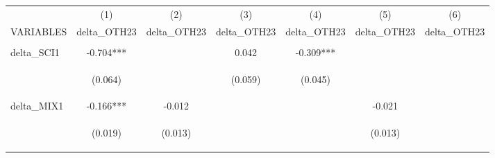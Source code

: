 \begin{center}
\begin{tabular}{lcccccc} \hline
 & (1) & (2) & (3) & (4) & (5) & (6) \\
VARIABLES & delta\_OTH23 & delta\_OTH23 & delta\_OTH23 & delta\_OTH23 & delta\_OTH23 & delta\_OTH23 \\ \hline
\vspace{4pt} & \begin{footnotesize}\end{footnotesize} & \begin{footnotesize}\end{footnotesize} & \begin{footnotesize}\end{footnotesize} & \begin{footnotesize}\end{footnotesize} & \begin{footnotesize}\end{footnotesize} & \begin{footnotesize}\end{footnotesize} \\
delta\_SCI1 & -0.704*** &  & 0.042 & -0.309*** &  &  \\
\vspace{4pt} & \begin{footnotesize}(0.064)\end{footnotesize} & \begin{footnotesize}\end{footnotesize} & \begin{footnotesize}(0.059)\end{footnotesize} & \begin{footnotesize}(0.045)\end{footnotesize} & \begin{footnotesize}\end{footnotesize} & \begin{footnotesize}\end{footnotesize} \\
delta\_MIX1 & -0.166*** & -0.012 &  &  & -0.021 &  \\
\vspace{4pt} & \begin{footnotesize}(0.019)\end{footnotesize} & \begin{footnotesize}(0.013)\end{footnotesize} & \begin{footnotesize}\end{footnotesize} & \begin{footnotesize}\end{footnotesize} & \begin{footnotesize}(0.013)\end{footnotesize} & \begin{footnotesize}\end{footnotesize} \\

\end{tabular}
\end{center}
